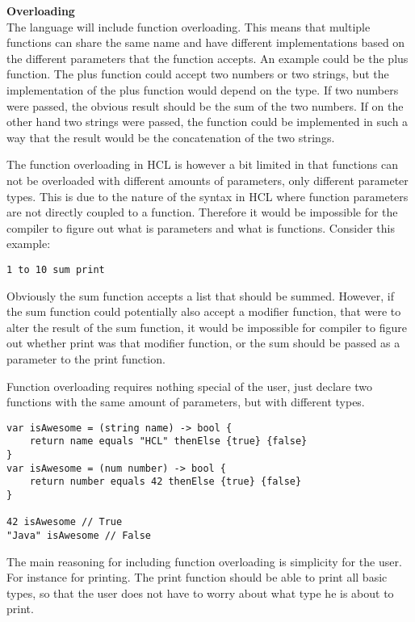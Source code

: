 \textbf{Overloading}\\

The language will include function overloading. 
This means that multiple functions can share the same name and have different implementations based on the different parameters that the function accepts. 
An example could be the plus function. 
The plus function could accept two numbers or two strings, but the implementation of the plus function would depend on the type.
If two numbers were passed, the obvious result should be the sum of the two numbers.
If on the other hand two strings were passed, the function could be implemented in such a way that the result would be the concatenation of the two strings.

The function overloading in HCL is however a bit limited in that functions can not be overloaded with different amounts of parameters, only different parameter types. 
This is due to the nature of the syntax in HCL where function parameters are not directly coupled to a function. 
Therefore it would be impossible for the compiler to figure out what is parameters and what is functions.
Consider this example:

\begin{lstlisting}
1 to 10 sum print
\end{lstlisting}

Obviously the sum function accepts a list that should be summed. 
However, if the sum function could potentially also accept a modifier function, that were to alter the result of the sum function, it would be impossible for compiler to figure out whether print was that modifier function, or the sum should be passed as a parameter to the print function.

Function overloading requires nothing special of the user, just declare two functions with the same amount of parameters, but with different types. 

\begin{lstlisting}
var isAwesome = (string name) -> bool {
	return name equals "HCL" thenElse {true} {false}
}
var isAwesome = (num number) -> bool {
	return number equals 42 thenElse {true} {false}
}

42 isAwesome // True
"Java" isAwesome // False
\end{lstlisting}

The main reasoning for including function overloading is simplicity for the user.
For instance for printing. 
The print function should be able to print all basic types, so that the user does not have to worry about what type he is about to print.


